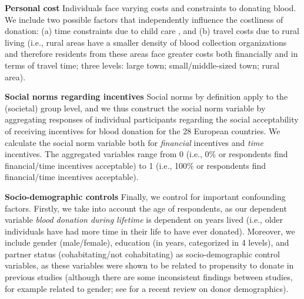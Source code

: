 \documentclass[AER]{AEA}
\begin{document}
\textbf{Personal cost} Individuals face varying costs and constraints to donating blood. We include two possible factors that independently influence the costliness of donation: (a) time constraints due to child care \cite[i.e., parents of small children may perceive time constraints to donate,][operationalized as number of children in household]{piersma_blood_2019}, and (b) travel costs due to rural living (i.e., rural areas have a smaller density of blood collection organizations and therefore residents from these areas face greater costs both financially and in terms of travel time; three levels: large town; small/middle-sized town; rural area).

\textbf{Social norms regarding incentives} Social norms by definition apply to the (societal) group level, and we thus construct the social norm variable by aggregating responses of individual participants regarding the social acceptability of receiving incentives for blood donation for the 28 European countries. We calculate the social norm variable both for \textit{financial} incentives and \textit{time} incentives. The aggregated variables range from 0 (i.e., 0\% or respondents find financial/time incentives acceptable) to 1 (i.e., 100\% or respondents find financial/time incentives acceptable).

\textbf{Socio-demographic controls} Finally, we control for important confounding factors. Firstly, we take into account the age of respondents, as our dependent variable \textit{blood donation during lifetime} is dependent on years lived (i.e., older individuals have had more time in their life to have ever donated). Moreover, we include gender (male/female), education (in years, categorized in 4 levels), and partner status (cohabitating/not cohabitating) as socio-demographic control variables, as these variables were shown to be related to propensity to donate in previous studies (although there are some inconsistent findings between studies, for example related to gender; see \cite{piersma_individual_2017} for a recent review on donor demographics).
\end{document}
